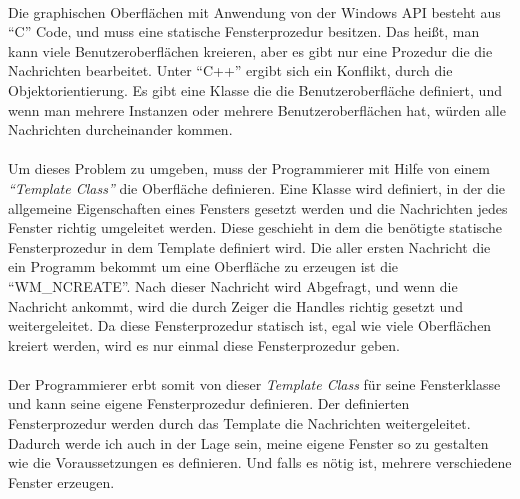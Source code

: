 \paragraph{}
Die graphischen Oberflächen mit Anwendung von der Windows API besteht aus "`C"' Code, und muss eine statische Fensterprozedur besitzen. Das heißt, man kann viele Benutzeroberflächen kreieren, aber es gibt nur eine Prozedur die die Nachrichten bearbeitet. Unter "`C++"' ergibt sich ein Konflikt, durch die Objektorientierung. Es gibt eine Klasse die die Benutzeroberfläche definiert, und wenn man mehrere Instanzen oder mehrere Benutzeroberflächen hat, würden alle Nachrichten durcheinander kommen.

\paragraph{}
Um dieses Problem zu umgeben, muss der Programmierer mit Hilfe von einem \textit{"`Template Class"'} die Oberfläche definieren. Eine Klasse wird definiert, in der die allgemeine Eigenschaften eines Fensters gesetzt werden und die Nachrichten jedes Fenster richtig umgeleitet werden. Diese geschieht in dem die benötigte statische Fensterprozedur in dem Template definiert wird. Die aller ersten Nachricht die ein Programm bekommt um eine Oberfläche zu erzeugen ist die "`WM\_NCREATE"'. Nach dieser Nachricht wird Abgefragt, und wenn die Nachricht ankommt, wird die durch Zeiger die Handles richtig gesetzt und weitergeleitet. Da diese Fensterprozedur statisch ist, egal wie viele Oberflächen kreiert werden, wird es nur einmal diese Fensterprozedur geben.

\paragraph{}
Der Programmierer erbt somit von dieser \textit{Template Class} für seine Fensterklasse und kann seine eigene Fensterprozedur definieren. Der definierten Fensterprozedur werden durch das Template die Nachrichten weitergeleitet. Dadurch werde ich auch in der Lage sein, meine eigene Fenster so zu gestalten wie die Voraussetzungen es definieren. Und falls es nötig ist, mehrere verschiedene Fenster erzeugen.